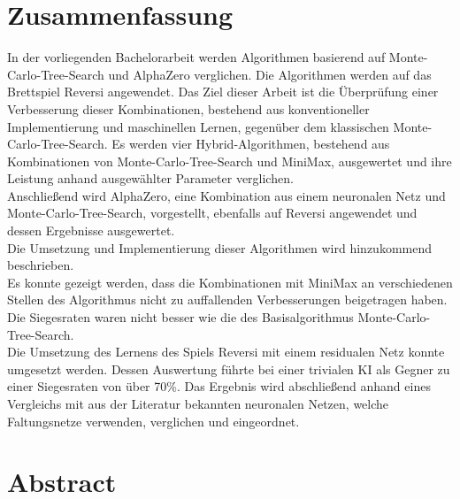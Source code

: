 \thispagestyle{empty}
\section*{Zusammenfassung}

\bigskip 


In der vorliegenden Bachelorarbeit werden Algorithmen basierend auf Monte-Carlo-Tree-Search und AlphaZero verglichen. Die Algorithmen werden auf das Brettspiel Reversi angewendet. Das Ziel dieser Arbeit ist die Überprüfung einer Verbesserung dieser Kombinationen, bestehend aus konventioneller Implementierung und maschinellen Lernen, gegenüber dem klassischen Monte-Carlo-Tree-Search. Es werden vier Hybrid-Algorithmen, bestehend aus Kombinationen von Monte-Carlo-Tree-Search und MiniMax, ausgewertet und ihre Leistung anhand ausgewählter Parameter verglichen.\\
Anschließend wird AlphaZero, eine Kombination aus einem neuronalen Netz und Monte-Carlo-Tree-Search, vorgestellt, ebenfalls auf Reversi angewendet und dessen Ergebnisse ausgewertet.\\
Die Umsetzung und Implementierung dieser Algorithmen wird hinzukommend beschrieben.\\
Es konnte gezeigt werden, dass die Kombinationen mit MiniMax an verschiedenen Stellen des Algorithmus nicht zu auffallenden Verbesserungen beigetragen haben. Die Siegesraten waren nicht besser wie die des Basisalgorithmus Monte-Carlo-Tree-Search.\\
Die Umsetzung des Lernens des Spiels Reversi mit einem residualen Netz konnte umgesetzt werden. Dessen Auswertung führte bei einer trivialen KI als Gegner zu einer Siegesraten von über 70\%. Das Ergebnis wird abschließend anhand eines Vergleichs mit aus der Literatur bekannten neuronalen Netzen, welche Faltungsnetze verwenden, verglichen und eingeordnet.

\section*{Abstract}

\bigskip 


